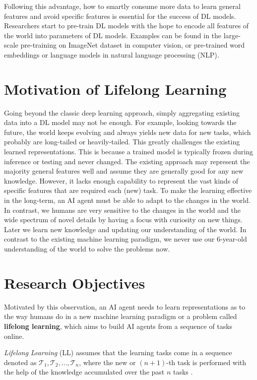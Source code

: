 Following this advantage, how to smartly consume more data to learn general features and avoid specific features is essential for the success of DL models.
Researchers start to pre-train DL models with the hope to encode all features of the world into parameters of DL models.
Examples can be found in the large-scale pre-training on ImageNet dataset \cite{deng2009imagenet,russakovsky2015imagenet,krizhevsky2012imagenet} in computer vision, or pre-trained word embeddings or language models \cite{peters2018deep,devlin2018bert} in natural language processing (NLP).

\section{Motivation of Lifelong Learning}
\label{chap1:motivation}
Going beyond the classic deep learning approach, simply aggregating existing data into a DL model may not be enough.
For example, looking towards the future, the world keeps evolving and always yields new data for new tasks, which probably are long-tailed or heavily-tailed.
This greatly challenges the existing learned representations.
This is because a trained model is typically frozen during inference or testing and never changed.
The existing approach may represent the majority general features well and assume they are generally good for any new knowledge.
However, it lacks enough capability to represent the vast kinds of specific features that are required each (new) task.
To make the learning effective in the long-term, an AI agent must be able to adapt to the changes in the world.
In contrast, we humans are very sensitive to the changes in the world and the wide spectrum of novel details by having a focus with curiosity on new things.
Later we learn new knowledge and updating our understanding of the world.
In contrast to the existing machine learning paradigm, we never use our 6-year-old understanding of the world to solve the problems now. 

\section{Research Objectives}
Motivated by this observation, an AI agent needs to learn representations as to the way humans do in a new machine learning paradigm or a problem called \textbf{lifelong learning}, which aims to build AI agents from a sequence of tasks online.

\textit{Lifelong Learning} (LL) assumes that the learning tasks come in a sequence denoted as $\mathcal{T}_1, \mathcal{T}_2, \dots, \mathcal{T}_n$, where the new or $(n+1)$-th task is performed with the help of the knowledge accumulated over the past $n$ tasks \cite{thrun1998lifelong,silver2013lifelong,chen2018lifelong}. 

